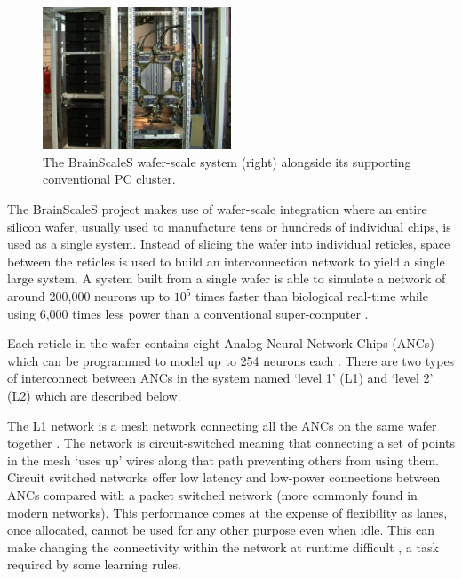 				\begin{figure}
					\center
					\includegraphics[width=0.5\textwidth]{figures/brainscales}
					
					\caption[The BrainScaleS wafer-scale system.]{The BrainScaleS
					wafer-scale system (right) alongside its supporting conventional PC cluster.}
					
					\label{fig:brainscales}
				\end{figure}
				
				The BrainScaleS project makes use of wafer-scale integration where an
				entire silicon wafer, usually used to manufacture tens or hundreds of
				individual chips, is used as a single system. Instead of slicing the
				wafer into individual reticles, space between the reticles is used to
				build an interconnection network to yield a single large system. A
				system built from a single wafer is able to simulate a network of around
				200,000 neurons up to $10^5$ times faster than biological real-time
				while using 6,000 times less power than a conventional super-computer
				\cite{schemmel08}.
				
				Each reticle in the wafer contains eight Analog Neural-Network Chips
				(ANCs) which can be programmed to model up to 254 neurons each
				\cite{schemmel10}. There are two types of interconnect between ANCs in
				the system named `level 1' (L1) and `level 2' (L2) which are described
				below.
			
				The L1 network is a mesh network connecting all the ANCs on the same
				wafer together \cite{fieres08}. The network is circuit-switched meaning
				that connecting a set of points in the mesh `uses up' wires along that
				path preventing others from using them. Circuit switched networks offer
				low latency and low-power connections between ANCs compared with a
				packet switched network (more commonly found in modern networks). This
				performance comes at the expense of flexibility as lanes, once
				allocated, cannot be used for any other purpose even when idle. This can
				make changing the connectivity within the network at runtime difficult
				\cite{dally04}, a task required by some learning rules.
				
